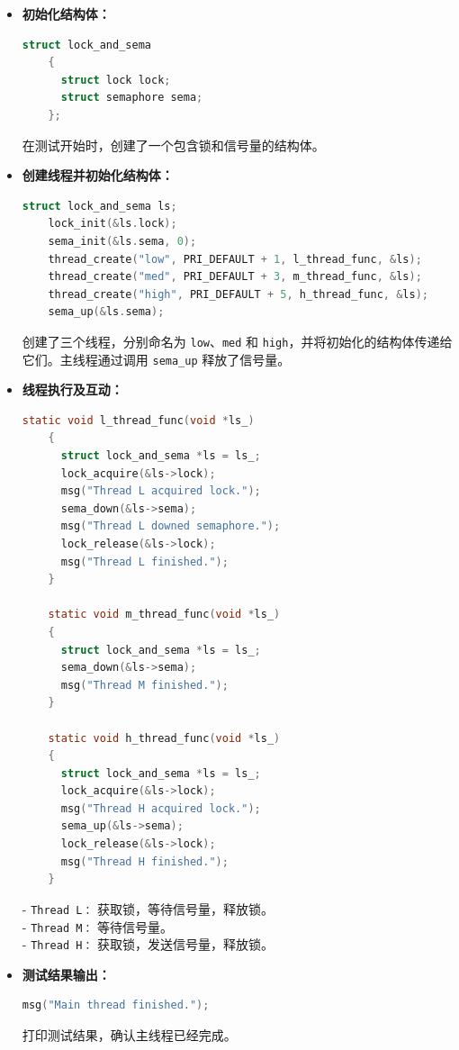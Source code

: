 \documentclass{article}
\begin{document}
\begin{itemize}
  \item \textbf{初始化结构体：}
        \begin{lstlisting}[language=C]
    struct lock_and_sema 
    {
      struct lock lock;
      struct semaphore sema;
    };
\end{lstlisting}
        在测试开始时，创建了一个包含锁和信号量的结构体。

  \item \textbf{创建线程并初始化结构体：}
        \begin{lstlisting}[language=C]
    struct lock_and_sema ls;
    lock_init(&ls.lock);
    sema_init(&ls.sema, 0);
    thread_create("low", PRI_DEFAULT + 1, l_thread_func, &ls);
    thread_create("med", PRI_DEFAULT + 3, m_thread_func, &ls);
    thread_create("high", PRI_DEFAULT + 5, h_thread_func, &ls);
    sema_up(&ls.sema);
\end{lstlisting}
        创建了三个线程，分别命名为 \texttt{low}、\texttt{med} 和 \texttt{high}，并将初始化的结构体传递给它们。主线程通过调用 \texttt{sema\_up} 释放了信号量。

  \item \textbf{线程执行及互动：}
        \begin{lstlisting}[language=C]
    static void l_thread_func(void *ls_) 
    {
      struct lock_and_sema *ls = ls_;
      lock_acquire(&ls->lock);
      msg("Thread L acquired lock.");
      sema_down(&ls->sema);
      msg("Thread L downed semaphore.");
      lock_release(&ls->lock);
      msg("Thread L finished.");
    }

    static void m_thread_func(void *ls_) 
    {
      struct lock_and_sema *ls = ls_;
      sema_down(&ls->sema);
      msg("Thread M finished.");
    }

    static void h_thread_func(void *ls_) 
    {
      struct lock_and_sema *ls = ls_;
      lock_acquire(&ls->lock);
      msg("Thread H acquired lock.");
      sema_up(&ls->sema);
      lock_release(&ls->lock);
      msg("Thread H finished.");
    }
\end{lstlisting}
        - \texttt{Thread L：} 获取锁，等待信号量，释放锁。 \\
        - \texttt{Thread M：} 等待信号量。 \\
        - \texttt{Thread H：} 获取锁，发送信号量，释放锁。

  \item \textbf{测试结果输出：}
        \begin{lstlisting}[language=C]
    msg("Main thread finished.");
\end{lstlisting}
        打印测试结果，确认主线程已经完成。

\end{itemize}
\end{document}

